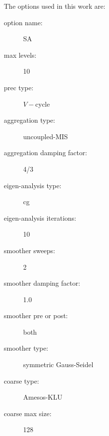 The options used in this work are:
\begin{description}
  \item[option name:] SA
  \item[max levels:] 10
  \item[prec type:] $V-$cycle
  \item[aggregation type:] uncoupled-MIS
  \item[aggregation damping factor:] 4/3
  \item[eigen-analysis type:] cg
  \item[eigen-analysis iterations:] 10
  \item[smoother sweeps:] 2
  \item[smoother damping factor:] 1.0
  \item[smoother pre or post:] both
  \item[smoother type:] symmetric Gauss-Seidel
  \item[coarse type:] Amesos-KLU
  \item[coarse max size:] 128
\end{description}
